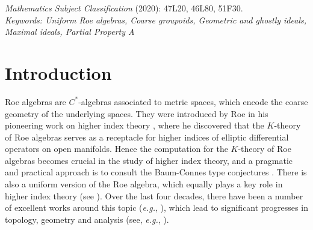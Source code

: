 \documentclass[12pt, a4paper]{amsart}
\numberwithin{equation}{section}
\theoremstyle{definition}
\theoremstyle{remark}
\begin{document}
\begin{abstract}
\end{abstract}

\date{\today}
\maketitle

\parskip 4pt

\noindent\textit{Mathematics Subject Classification} (2020): 47L20, 46L80, 51F30.\\
\textit{Keywords: Uniform Roe algebras, Coarse groupoids, Geometric and ghostly ideals, Maximal ideals, Partial Property A}

\section{Introduction}\label{sec:intro}

Roe algebras are $C^*$-algebras associated to metric spaces, which encode the coarse geometry of the underlying spaces. They were introduced by Roe in his pioneering work on higher index theory \cite{Roe88}, where he discovered that the $K$-theory of Roe algebras serves as a receptacle for higher indices of elliptic differential operators on open manifolds. 
Hence the computation for the $K$-theory of Roe algebras becomes crucial in the study of higher index theory, and a pragmatic and practical approach is to consult the Baum-Connes type conjectures \cite{BC00, BCH94, HR95}. There is also a uniform version of the Roe algebra, which equally plays a key role in higher index theory (see \cite{STY02, Spa09}). Over the last four decades, there have been a number of excellent works around this topic (\emph{e.g.}, \cite{CWY13, HLS02, KY06, WY12, Yu00}), which lead to significant progresses in topology, geometry and analysis (see, \emph{e.g.}, \cite{Roe93, Roe96}).
\end{document}
